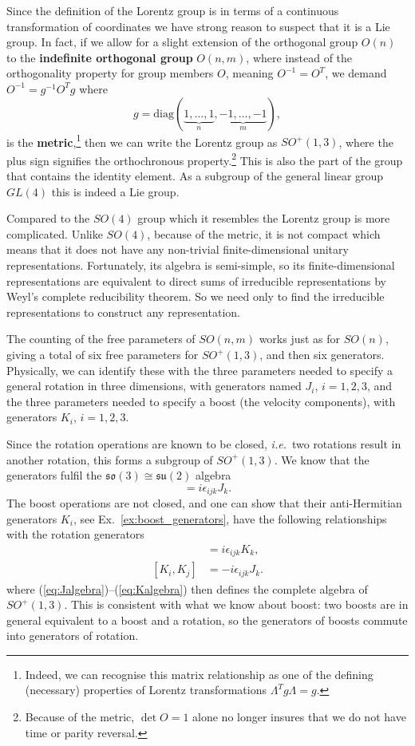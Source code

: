 \documentclass[notes.tex]{subfiles}
\begin{document}
Since the definition of the Lorentz group is in terms of a continuous transformation of coordinates we have strong reason to suspect that it is a Lie group. In fact, if we allow for a slight extension of the orthogonal group $O(n)$ to the {\bf indefinite orthogonal group} $O(n,m)$, where instead of the orthogonality property for group members $O$, meaning $O^{-1}=O^T$, we demand $O^{-1}=g^{-1}O^Tg$ where
\[g=\text{diag}(\underbrace{1,\ldots,1}_n,\underbrace{-1,\ldots,-1}_m),\] is the {\bf metric},\footnote{Indeed, we can recognise this matrix relationship as one of the defining (necessary) properties of Lorentz transformations $\Lambda^Tg\Lambda=g$.} then we can write the Lorentz group as $SO^+(1,3)$, where the plus sign signifies the orthochronous property.\footnote{Because of the metric, $\det O=1$ alone no longer insures that we do not have time or parity reversal.} This is also the part of the group that contains the identity element. As a subgroup of the general linear group $GL(4)$ this is indeed a Lie group.

Compared to the $SO(4)$ group which it resembles the Lorentz group is more complicated. Unlike $SO(4)$, because of the metric, it is not compact which means that it does not have any non-trivial finite-dimensional unitary representations. Fortunately, its algebra is semi-simple, so its finite-dimensional representations are equivalent to direct sums of irreducible representations by Weyl’s complete reducibility theorem. So we need only to find the irreducible representations to construct any representation.

The counting of the free parameters of $SO(n,m)$ works just as for $SO(n)$, giving a total of six free parameters for  $SO^+(1,3)$, and then six generators. Physically, we can identify these with the three parameters needed to specify a general rotation in three dimensions, with generators named $J_i$, $i=1,2,3$, and the three parameters needed to specify a boost (the velocity components), with generators $K_i$, $i=1,2,3$.

Since the rotation operations are known to be closed, {\it i.e.}\ two rotations result in another rotation, this forms a subgroup of $SO^+(1,3)$. We know that the generators fulfil the $\mathfrak{so}(3)\cong\mathfrak{su}(2)$ algebra
\begin{equation}
[J_i,J_j]=i\epsilon_{ijk}J_k.\label{eq:Jalgebra}
\end{equation}
The boost operations are not closed, and one can show that their anti-Hermitian generators $K_i$, see Ex.~\ref{ex:boost_generators}, have the following relationships with the rotation generators
\begin{align}
[K_i,J_j] &= i \epsilon_{ijk}K_k, \label{eq:KJalgebra} \\
[K_i,K_j] &= -i\epsilon_{ijk}J_k. \label{eq:Kalgebra}
\end{align}
where (\ref{eq:Jalgebra})--(\ref{eq:Kalgebra}) then defines the complete algebra of $SO^+(1,3)$. This is consistent with what we know about boost: two boosts are in general equivalent to a boost and a rotation, so the generators of boosts commute into generators of rotation.
\end{document}
